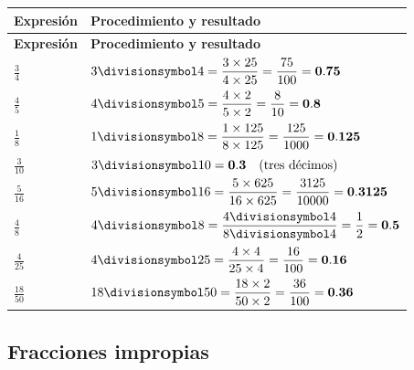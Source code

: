 \documentclass[spanish,letterpaper,oneside]{article}
\let\div\divisionsymbol
\begin{document}
{\small{}\renewcommand{\arraystretch}{1.32}
\begin{longtable}{|>{\raggedright\arraybackslash}p{}|>{\raggedright\arraybackslash}p{}|}\hline
\rowcolor{iiiepePale} \textbf{Expresión} & \textbf{Procedimiento y resultado} \\\hline
\endfirsthead
\hline
\rowcolor{iiiepePale} \textbf{Expresión} & \textbf{Procedimiento y resultado} \\\hline
\endhead
$\frac{3}{4}$ & $3\div 4 = \dfrac{3\times 25}{4\times 25} = \dfrac{75}{100} = \mathbf{0.75}$ \\\hline
$\frac{4}{5}$ & $4\div 5 = \dfrac{4\times 2}{5\times 2} = \dfrac{8}{10} = \mathbf{0.8}$ \\\hline
$\frac{1}{8}$ & $1\div 8 = \dfrac{1\times 125}{8\times 125} = \dfrac{125}{1000} = \mathbf{0.125}$ \\\hline
$\frac{3}{10}$ & $3\div 10 = \mathbf{0.3}\quad (\text{tres décimos})$ \\\hline
$\frac{5}{16}$ & $5\div 16 = \dfrac{5\times 625}{16\times 625} = \dfrac{3125}{10000} = \mathbf{0.3125}$ \\\hline
$\frac{4}{8}$ & $4\div 8 = \dfrac{4\div 4}{8\div 4} = \dfrac{1}{2} = \mathbf{0.5}$ \\\hline
$\frac{4}{25}$ & $4\div 25 = \dfrac{4\times 4}{25\times 4} = \dfrac{16}{100} = \mathbf{0.16}$ \\\hline
$\frac{18}{50}$ & $18\div 50 = \dfrac{18\times 2}{50\times 2} = \dfrac{36}{100} = \mathbf{0.36}$ \\\hline
\end{longtable}}

\subsection*{Fracciones impropias}
\end{document}
